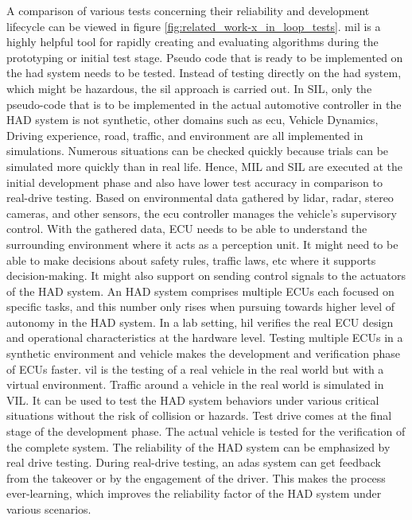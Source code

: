 A comparison of various tests concerning their reliability and development lifecycle can be viewed in figure \ref{fig:related_work-x_in_loop_tests}. \acrfull{mil} is a highly helpful tool for rapidly creating and evaluating algorithms during the prototyping or initial test stage. Pseudo code that is ready to be implemented on the \acrshort{had} system needs to be tested. Instead of testing directly on the \acrshort{had} system, which might be hazardous, the \acrfull{sil} approach is carried out. In SIL, only the pseudo-code that is to be implemented in the actual automotive controller in the HAD system is not synthetic, other domains such as \acrfull{ecu}, Vehicle Dynamics, Driving experience, road, traffic, and environment are all implemented in simulations. Numerous situations can be checked quickly because trials can be simulated more quickly than in real life. Hence, MIL and SIL are executed at the initial development phase and also have lower test accuracy in comparison to real-drive testing. Based on environmental data gathered by lidar, radar, stereo cameras, and other sensors, the \acrfull{ecu} controller manages the vehicle's supervisory control. With the gathered data, ECU needs to be able to understand the surrounding environment where it acts as a perception unit. It might need to be able to make decisions about safety rules, traffic laws, etc where it supports decision-making. It might also support on sending control signals to the actuators of the HAD system. An HAD system comprises multiple ECUs each focused on specific tasks, and this number only rises when pursuing towards higher level of autonomy in the HAD system. In a lab setting, \acrfull{hil} verifies the real ECU design and operational characteristics at the hardware level. Testing multiple ECUs in a synthetic environment and vehicle makes the development and verification phase of ECUs faster. \acrfull{vil} is the testing of a real vehicle in the real world but with a virtual environment. Traffic around a vehicle in the real world is simulated in VIL. It can be used to test the HAD system behaviors under various critical situations without the risk of collision or hazards. Test drive comes at the final stage of the development phase. The actual vehicle is tested for the verification of the complete system. The reliability of the HAD system can be emphasized by real drive testing. During real-drive testing, an \acrfull{adas} system can get feedback from the takeover or by the engagement of the driver. This makes the process ever-learning, which improves the reliability factor of the HAD system under various scenarios.


